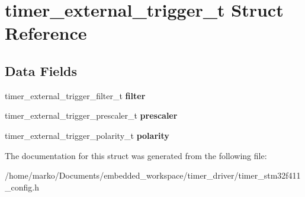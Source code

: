 \hypertarget{structtimer__external__trigger__t}{}\section{timer\+\_\+external\+\_\+trigger\+\_\+t Struct Reference}
\label{structtimer__external__trigger__t}
\subsection*{Data Fields}
\begin{DoxyCompactItemize}
\item 
\mbox{\label{structtimer__external__trigger__t_a27a62b19d6a850e47d8ebe8a707d49f2}} 
timer\+\_\+external\+\_\+trigger\+\_\+filter\+\_\+t {\bfseries filter}
\item 
\mbox{\label{structtimer__external__trigger__t_a50a2ed67206a967be3a10af1b4685cce}} 
timer\+\_\+external\+\_\+trigger\+\_\+prescaler\+\_\+t {\bfseries prescaler}
\item 
\mbox{\label{structtimer__external__trigger__t_acb707cdb7947ed2346965b26bb418c45}} 
timer\+\_\+external\+\_\+trigger\+\_\+polarity\+\_\+t {\bfseries polarity}
\end{DoxyCompactItemize}


The documentation for this struct was generated from the following file\+:\begin{DoxyCompactItemize}
\item 
/home/marko/\+Documents/embedded\+\_\+workspace/timer\+\_\+driver/timer\+\_\+stm32f411\+\_\+config.\+h\end{DoxyCompactItemize}

